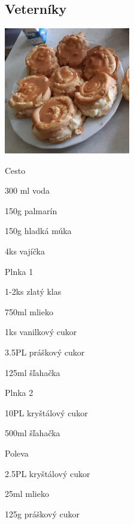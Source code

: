 \setcounter{step}{0}
\subsection{Veterníky}

\begin{ingredient}
\includegraphics[height=5.5cm]{images/veterniky}
\def\portions{4}%


\vspace{0.5cm}

\begin{subingredient}{Cesto}
	\item 300 ml voda
	\item 150g palmarín
	\item 150g hladká múka
	\item 4ks vajíčka
\end{subingredient}
\begin{subingredient}{Plnka 1}
	\item 1-2ks zlatý klas
	\item 750ml mlieko
	\item 1ks vanilkový cukor
	\item 3.5PL práškový cukor
	\item 125ml šľahačka
\end{subingredient}
\begin{subingredient}{Plnka 2}
	\item 10PL kryštálový cukor
	\item 500ml šľahačka
\end{subingredient}
\begin{subingredient}{Poleva}
	\item 2.5PL kryštálový cukor
	\item 25ml mlieko
	\item 125g práškový cukor
\end{subingredient}
\end{ingredient}
